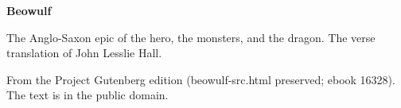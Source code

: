 \documentclass[11pt,letterpaper]{article}
\begin{document}
\color{ink}

\begin{titlepage}
\centering
\vspace*{4em}
{\LARGE\bfseries\color{heading} Beowulf\par}
\vspace{2em}
{\Large\bfseries\color{heading} \par}
\vspace{2.5em}
{\itshape\color{subhead}\parbox{0.8\linewidth}{\centering The Anglo-Saxon epic of the hero, the monsters, and the dragon. The verse translation of John Lesslie Hall.\par}}
\vfill
{\small From the Project Gutenberg edition (beowulf-src.html preserved; ebook 16328). The text is in the public domain.\par}
\vspace{2em}
\end{titlepage}

\tableofcontents


\end{document}
